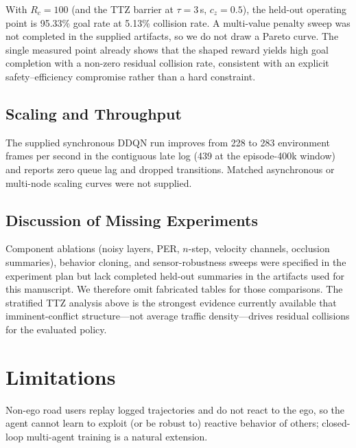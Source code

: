 \documentclass{article}
\begin{document}
With $R_c=100$ (and the TTZ barrier at $\tau=3$\,s, $c_z=0.5$), the held-out
operating point is 95.33\% goal rate at 5.13\% collision rate. A multi-value
penalty sweep was not completed in the supplied artifacts, so we do not draw
a Pareto curve. The single measured point already shows that the shaped
reward yields high goal completion with a non-zero residual collision rate,
consistent with an explicit safety--efficiency compromise rather than a
hard constraint.

\subsection{Scaling and Throughput}

The supplied synchronous DDQN run improves from 228 to 283 environment frames
per second in the contiguous late log (439 at the episode-400k window) and
reports zero queue lag and dropped transitions. Matched asynchronous or
multi-node scaling curves were not supplied.

\subsection{Discussion of Missing Experiments}

Component ablations (noisy layers, PER, $n$-step, velocity channels,
occlusion summaries), behavior cloning, and sensor-robustness sweeps were
specified in the experiment plan but lack completed held-out summaries in the
artifacts used for this manuscript. We therefore omit fabricated tables for
those comparisons. The stratified TTZ analysis above is the strongest
evidence currently available that imminent-conflict structure---not average
traffic density---drives residual collisions for the evaluated policy.

\section{Limitations}
\label{sec:limitations}

Non-ego road users replay logged trajectories and do not react to the ego,
so the agent cannot learn to exploit (or be robust to) reactive behavior of
others; closed-loop multi-agent training is a natural extension.
\end{document}
